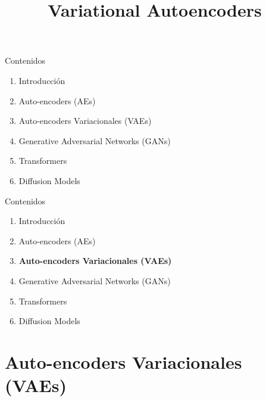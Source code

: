 



\title{Variational Autoencoders}


\maketitle

\begin{frame}{Contenidos}
  \begin{enumerate}
      \item Introducción
      \item Auto-encoders (AEs)
      \item{Auto-encoders Variacionales (VAEs)}
      \item{Generative Adversarial Networks (GANs)}
      \item{Transformers}
      \item{Diffusion Models}
    \end{enumerate}
\end{frame}


\begin{frame}{Contenidos}
  \begin{enumerate}
      \item Introducción
      \item Auto-encoders (AEs)
      \item{\textbf{Auto-encoders Variacionales (VAEs)}}
      \item{Generative Adversarial Networks (GANs)}
      \item{Transformers}
      \item{Diffusion Models}
    \end{enumerate}
\end{frame}




\section{Auto-encoders Variacionales (VAEs)}

